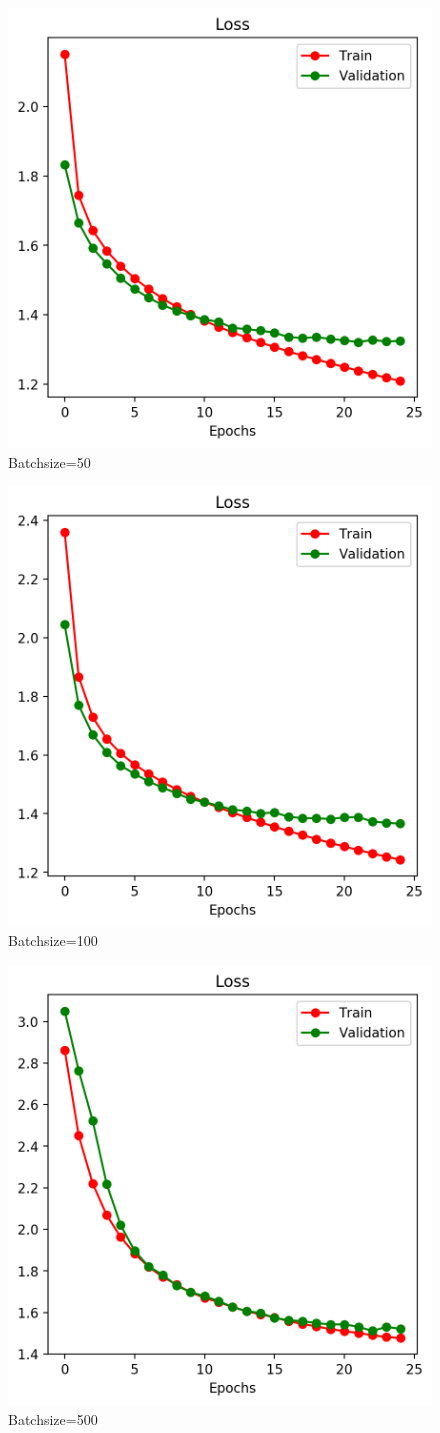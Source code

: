 \documentclass[12pt]{article}
\begin{document}
	\begin{figure}[H]
		\centering
		\caption{Batchsize=50}
		\includegraphics[width=0.55\linewidth]{figures/unet_learning_bs_50.png}
	\end{figure}


	\begin{figure}[H]
		\centering
		\caption{Batchsize=100}
		\includegraphics[width=0.55\linewidth]{figures/unet_learning_bs_100.png}
	\end{figure}

	\begin{figure}[H]
		\centering
		\caption{Batchsize=500}
		\includegraphics[width=0.55\linewidth]{figures/unet_learning_bs_500.png}
	\end{figure}
\end{document}

